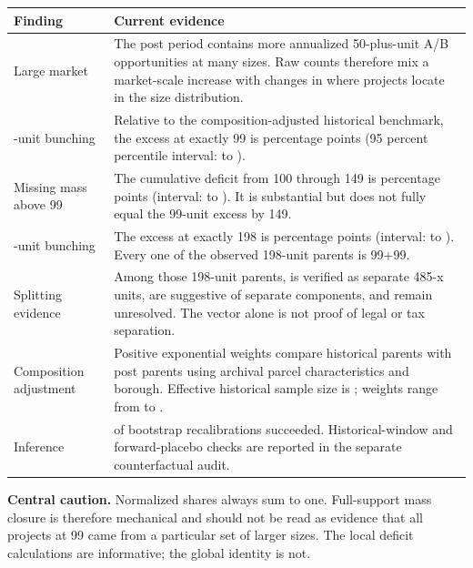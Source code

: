 \documentclass[10pt]{article}
\begin{document}
\begin{tabular}{>{\raggedright\arraybackslash}p{} p{}}
\toprule
\textbf{Finding} & \textbf{Current evidence} \\
\midrule
Large market & The post period contains more annualized 50-plus-unit A/B opportunities at many sizes. Raw counts therefore mix a market-scale increase with changes in where projects locate in the size distribution. \\
\addlinespace
99-unit bunching & Relative to the composition-adjusted historical benchmark, the excess at exactly 99 is \ExcessNinetyNine{} percentage points (95 percent percentile interval: \ExcessNinetyNineLower{} to \ExcessNinetyNineUpper{}). \\
\addlinespace
Missing mass above 99 & The cumulative deficit from 100 through 149 is \DeficitOneHundredOneFortyNine{} percentage points (interval: \DeficitOneHundredOneFortyNineLower{} to \DeficitOneHundredOneFortyNineUpper{}). It is substantial but does not fully equal the 99-unit excess by 149. \\
\addlinespace
198-unit bunching & The excess at exactly 198 is \ExcessOneNinetyEight{} percentage points (interval: \ExcessOneNinetyEightLower{} to \ExcessOneNinetyEightUpper{}). Every one of the \ExactOneNinetyEightParents{} observed 198-unit parents is 99+99. \\
\addlinespace
Splitting evidence & Among those 198-unit parents, \VerifiedOneNinetyEight{} is verified as separate 485-x units, \SuggestiveOneNinetyEight{} are suggestive of separate components, and \UnresolvedOneNinetyEight{} remain unresolved. The vector alone is not proof of legal or tax separation. \\
\addlinespace
Composition adjustment & Positive exponential weights compare \CalibrationHistoricalParents{} historical parents with \CalibrationPostParents{} post parents using archival parcel characteristics and borough. Effective historical sample size is \CalibrationESS{}; weights range from \MinimumCalibrationWeight{} to \MaximumCalibrationWeight{}. \\
\addlinespace
Inference & \SuccessfulBootstraps{} of \RequestedBootstraps{} bootstrap recalibrations succeeded. Historical-window and forward-placebo checks are reported in the separate counterfactual audit. \\
\bottomrule
\end{tabular}

\vspace{10pt}
\textbf{Central caution.} Normalized shares always sum to one. Full-support mass
closure is therefore mechanical and should not be read as evidence that all
projects at 99 came from a particular set of larger sizes. The local deficit
calculations are informative; the global identity is not.
\end{document}
